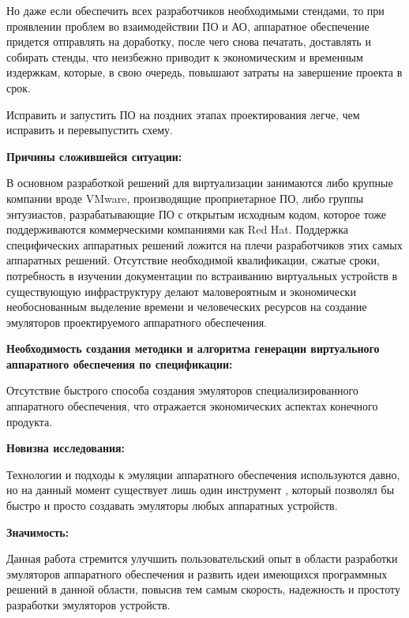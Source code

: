 Но даже если обеспечить всех разработчиков необходимыми стендами, то при проявлении
проблем во взаимодействии ПО и АО, аппаратное обеспечение придется отправлять на доработку,
после чего снова печатать, доставлять и собирать стенды, что неизбежно приводит к экономическим
и временным издержкам, которые, в свою очередь, повышают затраты на завершение проекта в срок.

Исправить и запустить ПО на поздних этапах проектирования легче, чем исправить и перевыпустить схему.

\textbf{Причины сложившейся ситуации:}

В основном разработкой решений для виртуализации занимаются либо крупные компании вроде VMware, производящие
проприетарное ПО, либо группы энтузиастов, разрабатывающие ПО с открытым исходным кодом, которое
тоже поддерживаются коммерческими компаниями как Red Hat. Поддержка специфических аппаратных решений
ложится на плечи разработчиков этих самых аппаратных решений. Отсутствие необходимой квалификации,
сжатые сроки, потребность в изучении документации по встраиванию виртуальных устройств в существующую
инфраструктуру делают маловероятным и экономически необоснованным выделение времени и
человеческих ресурсов на создание эмуляторов проектируемого аппаратного обеспечения.

\textbf{Необходимость создания методики и алгоритма генерации виртуального аппаратного
обеспечения по спецификации:}

Отсутствие быстрого способа создания эмуляторов специализированного аппаратного обеспечения, что отражается
экономических аспектах конечного продукта.

\textbf{Новизна исследования:}

Технологии и подходы к эмуляции аппаратного обеспечения используются давно,
но на данный момент существует лишь один инструмент \cite{imposters}, который позволял
бы быстро и просто создавать эмуляторы любых аппаратных устройств.


\textbf{Значимость:}

Данная работа стремится улучшить пользовательский опыт в области разработки эмуляторов
аппаратного обеспечения и развить идеи имеющихся программных решений в данной области,
повысив тем самым скорость, надежность и простоту разработки эмуляторов устройств.
